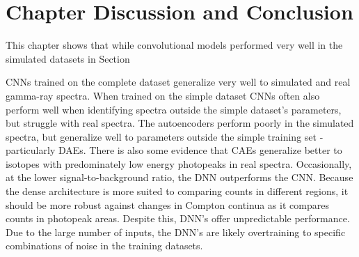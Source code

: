 \section{Chapter Discussion and Conclusion}

This chapter shows that while convolutional models performed very well in the simulated datasets in Section 



CNNs trained on the complete dataset generalize very well to simulated and real gamma-ray spectra. When trained on the simple dataset CNNs often also perform well when identifying spectra outside the simple dataset's parameters, but struggle with real spectra. The autoencoders perform poorly in the simulated spectra, but generalize well to parameters outside the simple training set - particularly DAEs. There is also some evidence that CAEs generalize better to isotopes with predominately low energy photopeaks in real spectra. Occasionally, at the lower signal-to-background ratio, the DNN outperforms the CNN. Because the dense architecture is more suited to comparing counts in different regions, it should be more robust against changes in Compton continua as it compares counts in photopeak areas. Despite this, DNN's offer unpredictable performance. Due to the large number of inputs, the DNN's are likely overtraining to specific combinations of noise in the training datasets.




